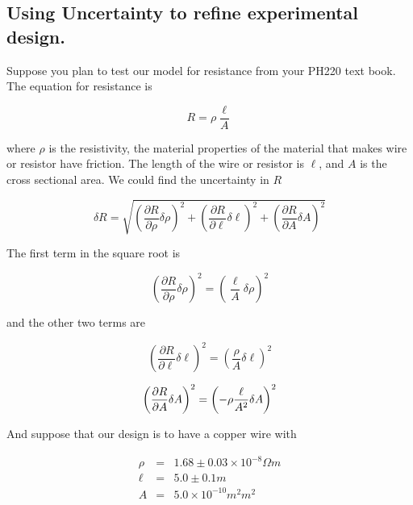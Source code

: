 \subsection{Using Uncertainty to refine experimental design.}

Suppose you plan to test our model for resistance from your PH220 text book. The equation for resistance is 

\begin{equation*}
	R=\rho \frac{\ell }{A}
\end{equation*}

\noindent where $\rho $ is the resistivity, the material properties of the material that makes wire or resistor have friction. The length of the wire or resistor is $\ell $, and $A$ is the cross sectional area. We could find the uncertainty in $R$

\begin{equation*}
	\delta R=\sqrt{\left( \frac{\partial R}{\partial \rho }\delta \rho \right)
		^{2}+\left( \frac{\partial R}{\partial \ell }\delta \ell \right) ^{2}+\left( 
		\frac{\partial R}{\partial A}\delta A\right) ^{2}}
\end{equation*}

\noindent The first term in the square root is 

\begin{equation*}
	\left( \frac{\partial R}{\partial \rho }\delta \rho \right) ^{2}=\left( 
	\frac{\ell }{A}\delta \rho \right) ^{2}
\end{equation*}

\noindent and the other two terms are 

\begin{equation*}
	\left( \frac{\partial R}{\partial \ell }\delta \ell \right) ^{2}=\left( 
	\frac{\rho }{A}\delta \ell \right) ^{2}
\end{equation*}

\begin{equation*}
	\left( \frac{\partial R}{\partial A}\delta A\right) ^{2}=\left( -\rho \frac{%
		\ell }{A^{2}}\delta A\right) ^{2}
\end{equation*}

And suppose that our design is to have a copper wire with 

\begin{eqnarray*}
	\rho &=&1.68\pm 0.03\times 10^{-8}\unit{\Omega}\unit{m} \\
	\ell &=&5.0\pm 0.1\unit{m} \\
	A &=&5.0\times 10^{-10}\unit{m}^{2}\unit{m}^{2}
\end{eqnarray*}

